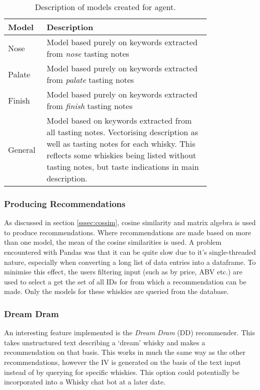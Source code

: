 \begin{table}
    \centering
    \caption{Description of models created for agent.}\label{tab:models}
    \begin{tabular}{p{0.1\linewidth} p{0.7\linewidth}} 
    \toprule
    Model   & Description            \\ \midrule
    Nose    & Model based purely on keywords extracted from \emph{nose} tasting notes  \\
    Palate  & Model based purely on keywords extracted from \emph{palate} tasting notes  \\
    Finish  & Model based purely on keywords extracted from \emph{finish} tasting notes  \\
    General & Model based on keywords extracted from all tasting notes.  Vectorising description as well as tasting notes for each whisky. This reflects some whiskies being listed without tasting notes, but taste indications in main description. \\
    \bottomrule
    \end{tabular}
\end{table}

\subsubsection{Producing Recommendations}
As discussed in section \ref{sssec:cossim}, cosine similarity and matrix algebra is used to produce recommendations.
Where recommendations are made based on more than one model, the mean of the cosine similarities is used.
A problem encountered with Pandas was that it can be quite slow due to it's single-threaded nature, especially
when converting a long list of data entries into a dataframe. To minimise this effect, the users filtering input (such
as by price, ABV etc.) are used to select a get the set of all IDs for from which a recommendation can be made.
Only the models for these whiskies are queried from the database.

\subsubsection{Dream Dram}
An interesting feature implemented is the \emph{Dream Dram} (DD) recommender.  This takes unstructured text describing
a `dream' whisky and makes a recommendation on that basis. This works in much the same way as the other recommendations, 
however the IV is generated on the basis of the text input instead of by querying for specific whiskies. This option 
could potentially be incorporated into a Whisky chat bot at a later date.

